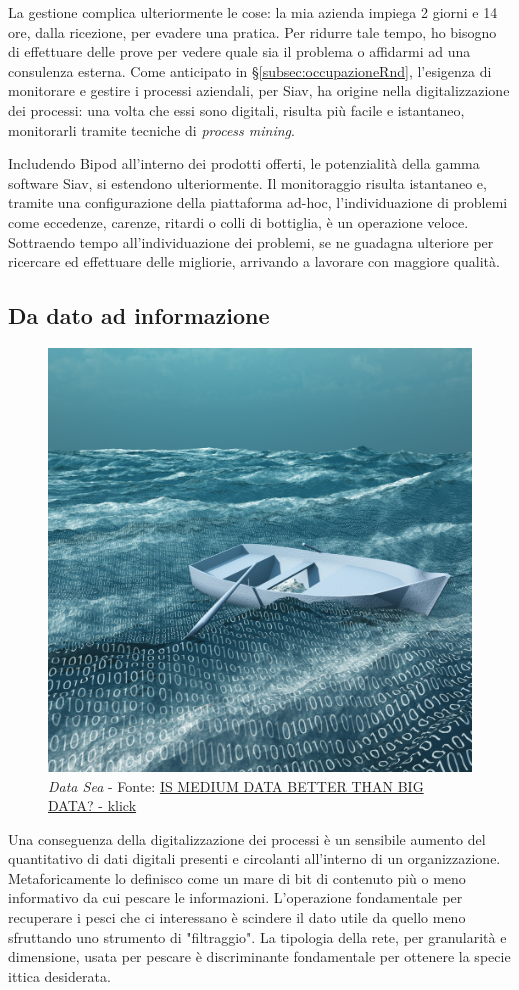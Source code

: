 La gestione complica ulteriormente le cose: la mia azienda impiega 2 giorni e 14 ore, dalla ricezione, per evadere una pratica. Per ridurre tale tempo, ho bisogno di effettuare delle prove per vedere quale sia il problema o affidarmi ad una consulenza esterna.
Come anticipato in \S\ref{subsec:occupazioneRnd}, l'esigenza di monitorare e gestire i processi aziendali, per Siav, ha origine nella digitalizzazione dei processi: una volta che essi sono digitali, risulta più facile e istantaneo, monitorarli tramite tecniche di \textit{process mining}.

Includendo Bipod all'interno dei prodotti offerti, le potenzialità della gamma software Siav, si estendono ulteriormente.
Il monitoraggio risulta istantaneo e, tramite una configurazione della piattaforma ad-hoc, l'individuazione di problemi come eccedenze, carenze, ritardi o colli di bottiglia, è un operazione veloce. Sottraendo tempo all'individuazione dei problemi, se ne guadagna ulteriore per ricercare ed effettuare delle migliorie, arrivando a lavorare con maggiore qualità.

\subsection{Da dato ad informazione}
\begin{figure}[H]
    \centering
    \includegraphics[width=0.50\columnwidth]{immagini/bigData.jpg}
    \caption{\textit{Data Sea} - Fonte: \href{https://www.klick.com/health/news/blog/strategy/is-medium-data-better-than-big-data/}{IS MEDIUM DATA BETTER THAN BIG DATA? - klick}}
    \label{fig:my_label}
\end{figure}

Una conseguenza della digitalizzazione dei processi è un sensibile aumento del quantitativo di dati digitali presenti e circolanti all'interno di un organizzazione. Metaforicamente lo definisco come un mare di bit di contenuto più o meno informativo da cui pescare le informazioni. L'operazione fondamentale per recuperare i pesci che ci interessano è scindere il dato utile da quello meno sfruttando uno strumento di "filtraggio".
La tipologia della rete, per granularità e dimensione, usata per pescare è discriminante fondamentale per ottenere la specie ittica desiderata.
